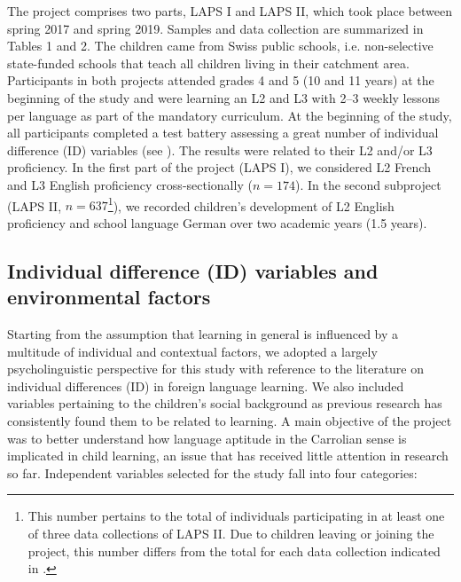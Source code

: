 \documentclass[output=paper]{langsci/langscibook}
\begin{document}
The project comprises two parts, LAPS I and LAPS II, which took place between spring 2017 and spring 2019. Samples and data collection are summarized in Tables 1 and 2. The children came from Swiss public schools, i.e. non-selective state-funded schools that teach all children living in their catchment area. Participants in both projects attended grades 4 and 5 (10 and 11 years) at the beginning of the study and were learning an L2 and L3 with 2--3 weekly lessons per language as part of the mandatory curriculum. At the beginning of the study, all participants completed a test battery assessing a great number of individual difference (ID) variables (see ). The results were related to their L2 and/or L3 proficiency. In the first part of the project (LAPS I), we considered L2 French and L3 English proficiency cross-sectionally ($n=174$). In the second subproject (LAPS II, $n=637$\footnote{This number pertains to the total of individuals participating in at least one of three data collections of LAPS II. Due to children leaving or joining the project, this number differs from the total for each data collection indicated in .}), we recorded children’s development of L2 English proficiency and school language German over two academic years (1.5 years).

\subsection{Individual difference (ID) variables and environmental factors}\largerpage

Starting from the assumption that learning in general is influenced by a multitude of individual and contextual factors, we adopted a largely psycholinguistic perspective for this study with reference to the literature on individual differences (ID) in foreign language learning. We also included variables pertaining to the children’s social background as previous research has consistently found them to be related to learning. A main objective of the project was to better understand how language aptitude in the Carrolian sense is implicated in child learning, an issue that has received little attention in research so far. Independent variables selected for the study fall into four categories:
\end{document}
